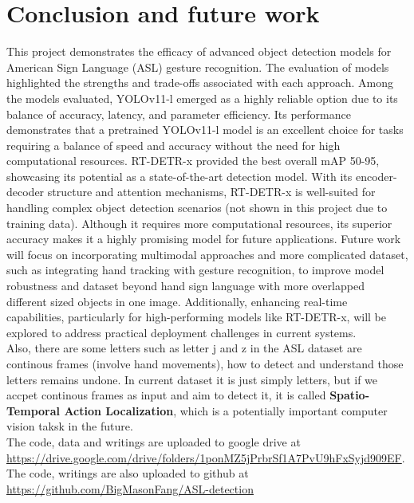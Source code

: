 \documentclass[a4paper]{article}
\begin{document}
\newpage
\section{Conclusion and future work}
This project demonstrates the efficacy of advanced object detection models for American Sign Language (ASL) gesture recognition. 
The evaluation of models highlighted the strengths and trade-offs associated with each approach.
Among the models evaluated, YOLOv11-l emerged as a highly reliable option due to its balance of accuracy, latency, and parameter efficiency. 
Its performance demonstrates that a pretrained YOLOv11-l model is an excellent choice for tasks requiring a balance of speed and accuracy without the need for high computational resources.
RT-DETR-x provided the best overall mAP 50-95, showcasing its potential as a state-of-the-art detection model. With its encoder-decoder structure and attention mechanisms, 
RT-DETR-x is well-suited for handling complex object detection scenarios (not shown in this project due to training data). Although it requires more computational resources, its superior accuracy makes it a highly promising model for future applications.
Future work will focus on incorporating multimodal approaches and more complicated dataset, such as integrating hand tracking with gesture recognition, to improve model robustness and dataset beyond hand sign language with more overlapped different sized objects in one image. 
Additionally, enhancing real-time capabilities, particularly for high-performing models like RT-DETR-x, will be explored to address practical deployment challenges in current systems. \\

    Also, there are some letters such as letter j and z in the ASL dataset are continous frames (involve hand movements), how to detect and understand those letters remains undone. In current dataset it is just simply letters, but if we accpet continous frames as input and 
aim to detect it, it is called \textbf{Spatio-Temporal Action Localization}\cite{10}, which is a potentially important computer vision taksk in the future.\\

The code, data and writings are uploaded to google drive at \url{https://drive.google.com/drive/folders/1ponMZ5jPrbrSf1A7PvU9hFxSyjd909EF}.
The code, writings are also uploaded to github at \url{https://github.com/BigMasonFang/ASL-detection}



\end{document}
